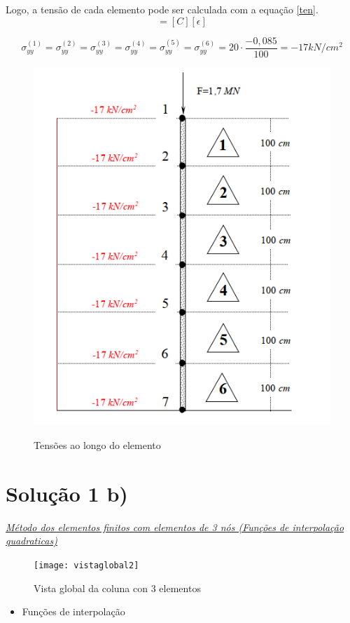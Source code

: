 \documentclass{article} %
\begin{document}
\indent Logo, a tensão de cada elemento pode ser calculada com a equação \ref{ten}.
\begin{equation*}
[\sigma]=[C][\epsilon]
\end{equation*}

\begin{equation}
\sigma_{yy}^{(1)}=\sigma_{yy}^{(2)}=\sigma_{yy}^{(3)}=\sigma_{yy}^{(4)}=\sigma_{yy}^{(5)}=\sigma_{yy}^{(6)}=20\cdot \frac{-0,085}{100}=-17 kN/cm^2
\end{equation}


\begin{figure}[H]
	\centering
	\caption{Tensões ao longo do elemento}
	\includegraphics[width=0.55\linewidth]{tensao}	
	\label{tensoes}	
\end{figure}
\newpage

\section*{Solução 1 b)}

\vspace{10mm}
\underline{\large \textit{Método dos elementos finitos com elementos de 3 nós (Funções de interpolação quadraticas)}}\\


\begin{figure}[H]
	\centering
	\caption{Vista global da coluna con 3 elementos}
	\texttt{[image: vistaglobal2]}	
	\label{patton}	
\end{figure}





\begin{itemize}
	\item Funções de interpolação	
\end{itemize}
\end{document}
